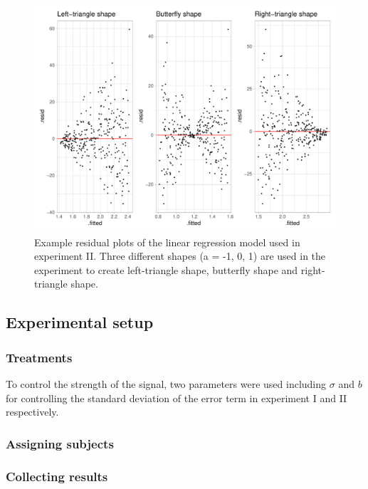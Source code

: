 \documentclass[]{interact}
\theoremstyle{plain}%
\theoremstyle{definition}
\theoremstyle{remark}
\begin{document}
\begin{figure}
\includegraphics[width=1\linewidth]{paper_comparison_files/figure-latex/different-shape-of-heter-1} \caption{Example residual plots of the linear regression model used in experiment II. Three different shapes (a = -1, 0, 1) are used in the experiment to create left-triangle shape, butterfly shape and right-triangle shape.}\label{fig:different-shape-of-heter}
\end{figure}

\hypertarget{experimental-setup}{%
\subsection{Experimental setup}\label{experimental-setup}}

\hypertarget{treatments}{%
\subsubsection{Treatments}\label{treatments}}

To control the strength of the signal, two parameters were used
including \(\sigma\) and \(b\) for controlling the standard deviation of
the error term in experiment I and II respectively.

\hypertarget{assigning-subjects}{%
\subsubsection{Assigning subjects}\label{assigning-subjects}}

\hypertarget{collecting-results}{%
\subsubsection{Collecting results}\label{collecting-results}}
\end{document}

